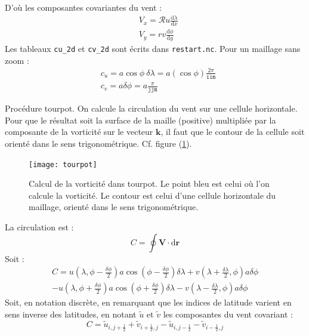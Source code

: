 \documentclass[a4paper,english,french]{article}
\newcommand{\ud}{\mathrm{d}}
\begin{document}
D'où les composantes covariantes du vent :
\begin{align*}
  & V_x = \mathscr{R} u \frac{\ud \lambda}{\ud x} \\
  & V_y = r v \frac{\ud \phi}{\ud y}
\end{align*}
Les tableaux \verb+cu_2d+ et \verb+cv_2d+ sont écrits dans
\verb+restart.nc+. Pour un maillage sans zoom :
\begin{align*}
  & c_u = a \cos \phi\ \delta \lambda = a (\cos \phi) \frac{2
    \pi}{\mathtt{iim}} \\
  & c_v = a \delta \phi = a \frac{\pi}{\mathtt{jjm}}
\end{align*}

Procédure tourpot. On calcule la circulation du vent sur une cellule
horizontale. Pour que le résultat soit la surface de la maille
(positive) multipliée par la composante de la vorticité sur le vecteur
$\mathbf{k}$, il faut que le contour de la cellule soit orienté dans
le sens trigonométrique. Cf. figure (\ref{fig:tourpot}).
\begin{figure}
  \centering
  \texttt{[image: tourpot]}
  \caption[Vorticité dans tourpot]{Calcul de la vorticité dans
    tourpot. Le point bleu est celui où l'on calcule la vorticité. Le
    contour est celui d'une cellule horizontale du maillage, orienté
    dans le sens trigonométrique.}
  \label{fig:tourpot}
\end{figure}
La circulation est :
\begin{equation*}
  C = \oint \mathbf{V} \cdot \ud \mathbf{r}
\end{equation*}
Soit :
\begin{multline*}
  C = u\left(\lambda, \phi - \frac{\delta \phi}{2} \right) a
  \cos\left(\phi - \frac{\delta \phi}{2} \right) \delta \lambda
  + v\left(\lambda + \frac{\delta \lambda}{2}, \phi \right)
  a \delta \phi \\
  - u\left(\lambda, \phi + \frac{\delta \phi}{2} \right) a
  \cos\left(\phi + \frac{\delta \phi}{2} \right) \delta \lambda
  - v\left(\lambda - \frac{\delta \lambda}{2}, \phi \right)
  a \delta \phi
\end{multline*}
Soit, en notation discrète, en remarquant que les indices de latitude
varient en sens inverse des latitudes, en notant $\tilde u$ et $\tilde
v$ les composantes du vent covariant :
\begin{equation*}
  C = \tilde u_{i, j + \frac{1}{2}} + \tilde v_{i + \frac{1}{2}, j}
  - \tilde u_{i, j - \frac{1}{2}} - \tilde v_{i - \frac{1}{2}, j}
\end{equation*}
\end{document}
